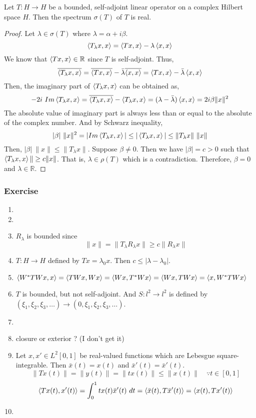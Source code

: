 \begin{theorem}[Spectrum]
	Let $T : H \to H$ be a bounded, self-adjoint linear operator on a complex Hilbert space $H$.
	Then the spectrum $\sigma(T)$ of $T$ is real.
\end{theorem}
\begin{proof}
	Let $\lambda \in \sigma(T)$ where $\lambda = \alpha + i\beta$.
	\[ \left\langle T_\lambda x,x \right\rangle = \left\langle Tx,x \right\rangle - \lambda\left\langle x,x \right\rangle \]
	We know that $\left\langle Tx,x \right\rangle \in \mathbb{R}$ since $T$ is self-adjoint.
	Thus,
	\[ \overline{\left\langle T_\lambda x ,x \right\rangle} = \overline{\left\langle Tx,x \right\rangle} - \bar{\lambda}\overline{\left\langle x,x \right\rangle} = \left\langle Tx,x \right\rangle - \bar{\lambda}\left\langle x,x \right\rangle \]
	Then, the imaginary part of $\left\langle T_\lambda x,x \right\rangle$ can be obtained as,
	\[ -2i\ Im \left\langle T_\lambda x,x \right\rangle = \overline{\left\langle T_\lambda x,x \right\rangle} - \left\langle T_\lambda x,x \right\rangle = (\lambda-\bar{\lambda})\left\langle x,x \right\rangle = 2i\beta \|x\|^2 \]
	The absolute value of imaginary part is always less than or equal to the absolute of the complex number.
	And by Schwarz inequality,
	\[ |\beta|\ \|x\|^2 = |Im\left\langle T_\lambda x,x \right\rangle| \le |\left\langle T_\lambda x,x \right\rangle| \le \|T_\lambda x\|\ \|x\| \]
	Then, $|\beta|\ \|x\| \le \|T_\lambda x\|$.
	Suppose $\beta \ne 0$.
	Then we have $|\beta| = c > 0$ such that $\left\langle T_\lambda x,x \right\rangle \| \ge c\|x\|$.
	That is, $\lambda \in \rho(T)$ which is a contradiction.
	Therefore, $\beta = 0$ and $\lambda \in \mathbb{R}$.
\end{proof}

\subsubsection{Exercise}
\begin{enumerate}
	\item 
	\item
	\item $R_\lambda$ is bounded since
		\[ \|x\| = \|T_\lambda R_\lambda x\| \ge c\|R_\lambda x\| \]
	\item $T : H \to H$ defined by $Tx = \lambda_0 x$.
		Then $c \le |\lambda-\lambda_0|$.
	\item $\left\langle W^\ast TWx,x \right\rangle = \left\langle TWx,Wx \right\rangle = \left\langle Wx,T^\ast Wx \right\rangle = \left\langle Wx,TWx \right\rangle = \left\langle x,W^\ast TWx \right\rangle$ 
	\item $T$ is bounded, but not self-adjoint.
		And $S:l^2 \to l^2$ is defined by $(\xi_1,\xi_2,\xi_3,\dotsc) \to (0,\xi_1,\xi_2,\xi_3,\dotsc)$.
	\item
	\item closure or exterior ? (I don't get it)
	\item Let $x,x' \in L^2[0,1]$ be real-valued functions which are Lebesgue square-integrable.
		Then $\bar{x}(t) = x(t)$ and $\bar{x}'(t) = \bar{x}'(t)$.
		\[ \|Tx(t)\| = \|y(t)\| = \|tx(t)\| \le \|x(t)\|\quad \because t \in [0,1] \]
		\[ \left\langle Tx(t),x'(t) \right\rangle = \int_0^1 tx(t)\bar{x}'(t)\ dt = \left\langle \bar{x}(t),T\bar{x}'(t) \right\rangle = \left\langle x(t),Tx'(t) \right\rangle \]
	\item
\end{enumerate}

